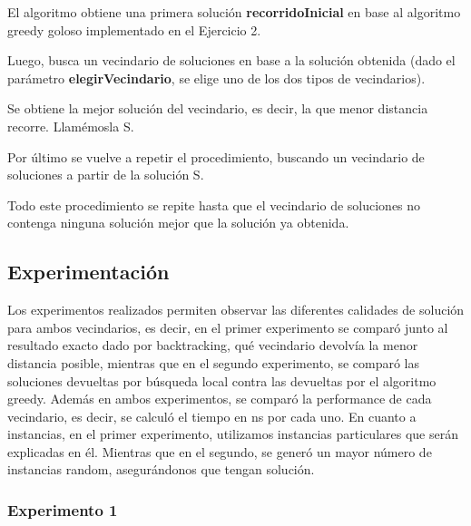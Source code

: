             El algoritmo obtiene una primera solución \textbf{recorridoInicial} en base al algoritmo greedy goloso implementado en el Ejercicio 2.
            \par Luego, busca un vecindario de soluciones en base a la solución obtenida (dado el parámetro \textbf{elegirVecindario}, se elige uno de los dos tipos de vecindarios).
            \par Se obtiene la mejor solución del vecindario, es decir, la que menor distancia recorre. Llamémosla S.
            \par Por último se vuelve a repetir el procedimiento, buscando un vecindario de soluciones a partir de la solución S.

            \par Todo este procedimiento se repite hasta que el vecindario de soluciones no contenga ninguna solución mejor que la solución ya obtenida.


    \subsection{Experimentación}
    Los experimentos realizados permiten observar las diferentes calidades de solución para ambos vecindarios, es decir, en el primer experimento se comparó junto al resultado exacto dado por backtracking, qué vecindario devolvía la menor distancia posible, mientras que en el segundo experimento, se comparó las soluciones devueltas por búsqueda local contra las devueltas por el algoritmo greedy. Además en ambos experimentos, se comparó la performance de cada vecindario, es decir, se calculó el tiempo en ns por cada uno. En cuanto a instancias, en el primer experimento, utilizamos instancias particulares que serán explicadas en él. Mientras que en el segundo, se generó un mayor número de instancias random, asegurándonos que tengan solución.



        \subsubsection{Experimento 1} 

